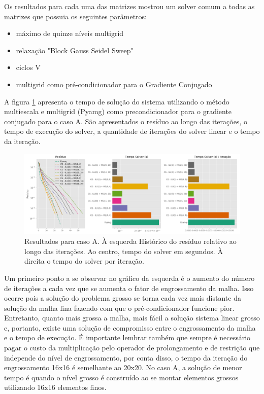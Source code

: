 Os resultados para cada uma das matrizes mostrou um solver comum a todas as matrizes que possuia os seguintes parâmetros:

\begin{itemize}
    \item máximo de quinze níveis multigrid
    \item relaxação "Block Gauss Seidel Sweep" 
    \item ciclos V
    \item multigrid como pré-condicionador para o Gradiente Conjugado
\end{itemize}

A figura \ref{fig:reservatorio100x100_1} apresenta o tempo de solução do sistema utilizando o método multiescala e multigrid (Pyamg) como precondicionador para o gradiente conjugado para o caso A. São apresentados o resíduo ao longo das iterações, o tempo de execução do solver, a quantidade de iterações do solver linear e o tempo da iteração.

\begin{figure}[!htbp]
\label{fig:reservatorio100x100_1}
\centering
\includegraphics[width=\textwidth]{chap08/figs/reservatorio100x100_1.png}
\caption{Resultados para caso A. À esquerda Histórico do resíduo relativo ao longo das iterações. 
Ao centro, tempo do solver em segundos. À direita o tempo do solver por iteração. }
\end{figure}

Um primeiro ponto a se observar no gráfico da esquerda é o aumento do número de iterações a cada vez que se aumenta o fator de engrossamento da malha. 
Isso ocorre pois a solução do problema grosso se torna cada vez mais distante da solução da malha fina fazendo com que o pré-condicionador funcione pior. 
Entretanto, quanto mais grossa a malha, mais fácil a solução sistema linear grosso e, portanto, existe uma solução de compromisso 
entre o engrossamento da malha e o tempo de execução. É importante lembrar também que sempre é necessário pagar o custo da multiplicação pelo
operador de prolongamento e de restrição que independe do nível de engrossamento, por conta disso, o tempo da iteração do engrossamento 16x16
é semelhante ao 20x20. No caso A, a solução de menor tempo é quando o nível grosso é construído ao se montar elementos grossos utilizando 16x16 elementos finos. 



